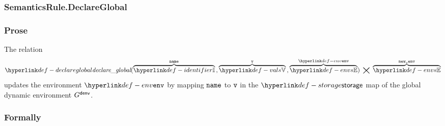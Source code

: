 \begin{mathpar}
\end{mathpar}

\subsubsection{SemanticsRule.DeclareGlobal\label{sec:SemanticsRule.DeclareGlobal}}
\subsubsection{Prose}
The relation
\hypertarget{def-declareglobal}{}
\[
  \declareglobal(\overname{\Identifiers}{\name} \aslsep \overname{\vals}{\vv} \aslsep \overname{\envs}{\env}) \;\aslrel\; \overname{\envs}{\newenv}
\]
updates the environment $\env$ by mapping $\name$ to $\vv$ in the $\storage$ map of the global dynamic environment $G^\denv$.

\subsubsection{Formally}
\begin{mathpar}
\end{mathpar}
